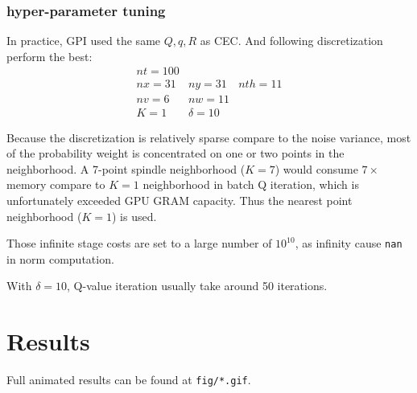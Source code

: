 \documentclass[conference]{IEEEtran}
\begin{document}
\subsubsection{hyper-parameter tuning}
In practice, GPI used the same $Q,q,R$ as CEC. 
And following discretization perform the best:
\[
\begin{array}{lll}
nt=100&&\\ 
nx=31&ny=31&nth=11\\ 
nv=6&nw=11&\\
K=1&\delta = 10\end{array} 
\]

Because the discretization is relatively sparse compare to the noise variance,
most of the probability weight is concentrated on one or two points in the neighborhood.
A 7-point spindle neighborhood ($K=7$) would consume $7\times$ memory 
compare to $K=1$ neighborhood in batch Q iteration,
which is unfortunately exceeded GPU GRAM capacity.
Thus the nearest point neighborhood ($K=1$) is used.

Those infinite stage costs are set to a large number of $10^{10}$, 
as infinity cause \texttt{nan} in norm computation.

With $\delta=10$, Q-value iteration usually take around 50 iterations.

\section{Results}
Full animated results can be found at \texttt{fig/*.gif}.
\end{document}
